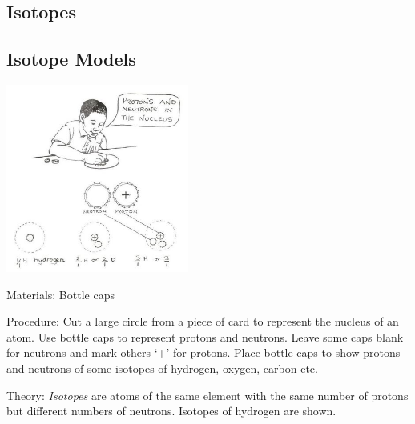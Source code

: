 \begin{multicols}{2}

\section*{Isotopes}


\subsection{Isotope Models}

\begin{center}
\includegraphics[width=0.45\textwidth]{./img/source/isotopes.jpg}
\end{center}

\begin{description*}
\item[Materials:]{Bottle caps}
\item[Procedure:]{Cut a large
circle from a piece of card to represent
the nucleus of an atom. Use bottle caps to represent protons and
neutrons. Leave some caps blank
for neutrons and mark others `+' for protons.
Place bottle caps to show protons and neutrons of some
isotopes of hydrogen, oxygen, carbon etc.}
\item[Theory:]{\emph{Isotopes} are atoms of the same element with the same number of protons but different numbers of neutrons. Isotopes of hydrogen are shown.}
\end{description*}



\end{multicols}

\pagebreak
